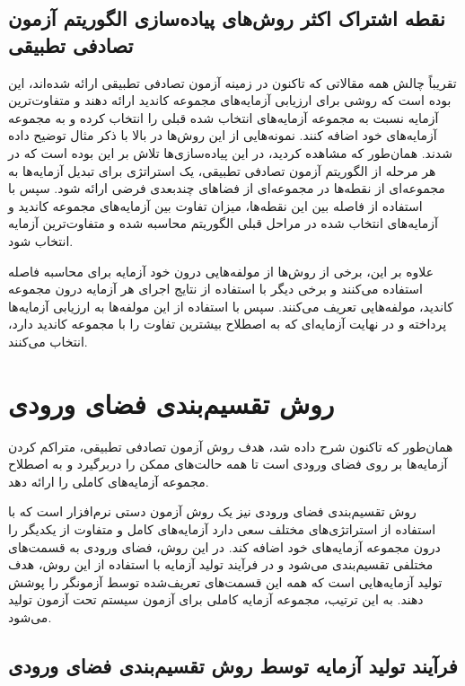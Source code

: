 \subsection{نقطه اشتراک اکثر روش‌های پیاده‌سازی الگوریتم آزمون تصادفی تطبیقی}\label{commonpoint}

تقریباً چالش همه مقالاتی که تاکنون در زمینه آزمون تصادفی تطبیقی ارائه شده‌اند، این بوده است که روشی برای ارزیابی آزمایه‌های مجموعه کاندید ارائه دهند و متفاوت‌ترین آزمایه نسبت به مجموعه آزمایه‌های انتخاب شده قبلی را انتخاب کرده و به مجموعه آزمایه‌های خود اضافه کنند. نمونه‌هایی از این روش‌ها در بالا با ذکر مثال توضیح داده شدند. همان‌طور که مشاهده کردید، در این پیاده‌سازی‌ها تلاش بر این بوده است که در هر مرحله از الگوریتم آزمون تصادفی تطبیقی، یک استراتژی برای تبدیل آزمایه‌ها به مجموعه‌ای از نقطه‌ها در مجموعه‌ای از فضاهای چندبعدی فرضی ارائه شود. سپس با استفاده از فاصله بین این نقطه‌ها، میزان تفاوت بین آزمایه‌های مجموعه کاندید و آزمایه‌های انتخاب شده در مراحل قبلی الگوریتم محاسبه شده و متفاوت‌ترین آزمایه انتخاب شود.

علاوه بر این، برخی از روش‌ها از مولفه‌هایی درون خود آزمایه برای محاسبه فاصله استفاده می‌کنند و برخی دیگر با استفاده از نتایج اجرای هر آزمایه درون مجموعه کاندید، مولفه‌هایی تعریف می‌کنند. سپس با استفاده از این مولفه‌ها به ارزیابی آزمایه‌ها پرداخته و در نهایت آزمایه‌ای که به اصطلاح بیشترین تفاوت را با مجموعه کاندید دارد، انتخاب می‌کنند.

\section{روش تقسیم‌بندی فضای ورودی}

همان‌طور که تاکنون شرح داده شد، هدف روش آزمون تصادفی تطبیقی، متراکم کردن آزمایه‌ها بر روی فضای ورودی است تا همه حالت‌های ممکن را دربرگیرد و به اصطلاح مجموعه آزمایه‌های کاملی را ارائه دهد.

روش تقسیم‌بندی فضای ورودی
\cite{vagoun1996input}
 نیز یک روش آزمون دستی نرم‌افزار است که با استفاده از استراتژی‌های مختلف سعی دارد آزمایه‌های کامل و متفاوت از یکدیگر را درون مجموعه آزمایه‌های خود اضافه کند. در این روش، فضای ورودی به قسمت‌های مختلفی تقسیم‌بندی می‌شود و در فرآیند تولید آزمایه با استفاده از این روش، هدف تولید آزمایه‌هایی است که همه این قسمت‌های تعریف‌شده توسط آزمونگر را پوشش دهند. به این ترتیب، مجموعه آزمایه کاملی برای آزمون سیستم تحت آزمون تولید می‌شود.

\subsection{فرآیند تولید آزمایه توسط روش تقسیم‌بندی فضای ورودی}

